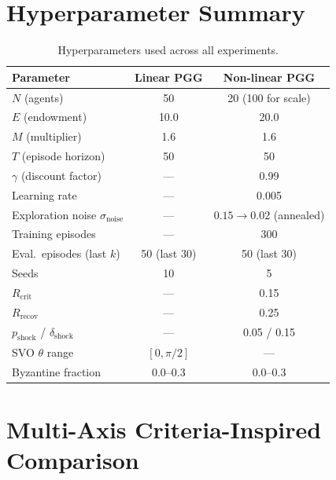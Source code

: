 \documentclass{article}
\begin{document}
\section{Hyperparameter Summary}
\label{app:hyperparams}

\begin{table}[h]
\centering
\caption{Hyperparameters used across all experiments.}
\label{tab:hyperparams}
\begin{tabular}{lcc}
\toprule
\textbf{Parameter} & \textbf{Linear PGG} & \textbf{Non-linear PGG} \\
\midrule
$N$ (agents) & 50 & 20 (100 for scale) \\
$E$ (endowment) & 10.0 & 20.0 \\
$M$ (multiplier) & 1.6 & 1.6 \\
$T$ (episode horizon) & 50 & 50 \\
$\gamma$ (discount factor) & --- & 0.99 \\
Learning rate & --- & 0.005 \\
Exploration noise $\sigma_{\text{noise}}$ & --- & $0.15 \to 0.02$ (annealed) \\
Training episodes & --- & 300 \\
Eval.\ episodes (last $k$) & 50 (last 30) & 50 (last 30) \\
Seeds & 10 & 5 \\
$R_{\text{crit}}$ & --- & 0.15 \\
$R_{\text{recov}}$ & --- & 0.25 \\
$p_{\text{shock}}$ / $\delta_{\text{shock}}$ & --- & 0.05 / 0.15 \\
SVO $\theta$ range & $[0, \pi/2]$ & --- \\
Byzantine fraction & 0.0--0.3 & 0.0--0.3 \\
\bottomrule
\end{tabular}
\end{table}

\section{Multi-Axis Criteria-Inspired Comparison}
\label{app:melting_pot}
\end{document}
